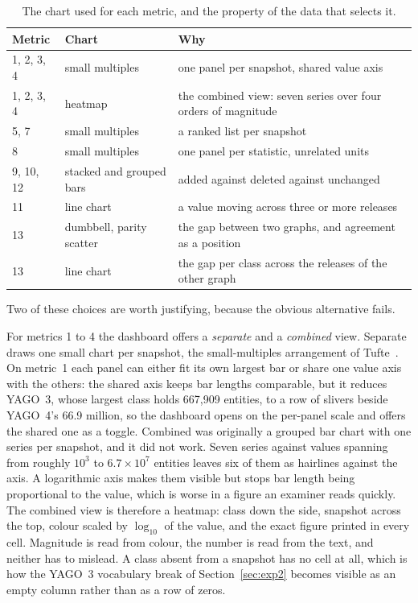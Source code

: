 \begin{table}[htbp]
  \centering
  \caption[]{The chart used for each metric, and the
    property of the data that selects it.}
  \label{tab:dash_charts}
  \footnotesize
  \begin{tabular}{llp{6.2cm}}
    \toprule
    Metric & Chart & Why \\
    \midrule
    1, 2, 3, 4 & small multiples & one panel per snapshot, shared value axis \\
    1, 2, 3, 4 & heatmap & the combined view: seven series over four orders of magnitude \\
    5, 7       & small multiples & a ranked list per snapshot \\
    8          & small multiples & one panel per statistic, unrelated units \\
    9, 10, 12  & stacked and grouped bars & added against deleted against unchanged \\
    11         & line chart & a value moving across three or more releases \\
    13         & dumbbell, parity scatter & the gap between two graphs, and agreement as a position \\
    13         & line chart & the gap per class across the releases of the other graph \\
    \bottomrule
  \end{tabular}
\end{table}

Two of these choices are worth justifying, because the obvious alternative fails.

For metrics 1 to 4 the dashboard offers a \emph{separate} and a \emph{combined}
view. Separate draws one small chart per snapshot, the small-multiples
arrangement of Tufte~\cite{tufte1990envisioning}. On metric~1 each panel can
either fit its own largest bar or share one value axis with the others: the
shared axis keeps bar lengths comparable, but it reduces YAGO~3, whose largest
class holds 667{,}909 entities, to a row of slivers beside YAGO~4's 66.9
million, so the dashboard opens on the per-panel scale and offers the shared one
as a toggle. Combined was originally a
grouped bar chart with one series per snapshot, and it did not work. Seven series
against values spanning from roughly $10^3$ to $6.7 \times 10^7$ entities leaves
six of them as hairlines against the axis. A logarithmic axis makes them visible
but stops bar length being proportional to the value, which is worse in a figure
an examiner reads quickly. The combined view is therefore a heatmap: class down
the side, snapshot across the top, colour scaled by $\log_{10}$ of the value, and
the exact figure printed in every cell. Magnitude is read from colour, the number
is read from the text, and neither has to mislead. A class absent from a snapshot
has no cell at all, which is how the YAGO~3 vocabulary break of
Section~\ref{sec:exp2} becomes visible as an empty column rather than as a row of
zeros.

